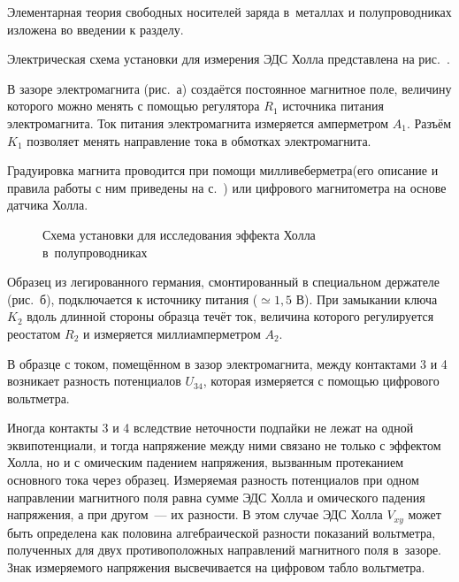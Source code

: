 


Элементарная теория свободных носителей заряда в~металлах и полупроводниках изложена во введении к разделу.

\experiment Электрическая схема установки для измерения ЭДС Холла представлена на рис.~.

В зазоре электромагнита (рис.~а) создаётся постоянное магнитное поле, величину которого можно менять с помощью регулятора $R_1$ источника питания электромагнита. Ток питания электромагнита измеряется амперметром $A_1$. Разъём $K_1$ позволяет менять направление тока в обмотках электромагнита.

Градуировка магнита проводится при помощи милливеберметра(его описание и правила работы с ним приведены на с.~\pageref{MWB}) или цифрового магнитометра на основе датчика Холла.
\begin{figure}[h!]
	\caption{Схема установки для исследования эффекта Холла в~полупроводниках}
\end{figure}

Образец из легированного германия, смонтированный в специальном держателе (рис.~б), подключается к источнику питания ($\simeq 1,5$ В). При замыкании ключа $K_2$ вдоль длинной стороны образца течёт ток, величина которого регулируется реостатом $R_2$ и измеряется миллиамперметром $A_2$.

В образце с током, помещённом в зазор электромагнита, между контактами 3 и 4 возникает разность потенциалов $U_{34}$, которая измеряется с помощью цифрового вольтметра.

Иногда контакты 3 и 4 вследствие неточности подпайки не лежат на одной эквипотенциали, и тогда напряжение между ними связано не только с эффектом Холла, но и с омическим падением напряжения, вызванным протеканием основного тока  через образец. Измеряемая разность потенциалов при одном направлении магнитного поля равна сумме ЭДС Холла и омического падения напряжения, а при другом~--- их разности. В этом случае ЭДС Холла $V_{xy}$ может быть определена как половина алгебраической разности показаний вольтметра, полученных для двух противоположных направлений магнитного поля в~зазоре. Знак измеряемого напряжения высвечивается на цифровом табло вольтметра.


